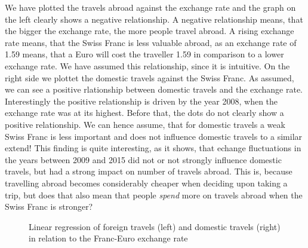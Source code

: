 \documentclass[12pt,a4paper,bibliography=totocnumbered,listof=totocnumbered]{scrartcl}
\begin{document}
We have plotted the travels abroad against the exchange rate and the graph on the left clearly shows a negative relationship. A negative relationship means, that the bigger the exchange rate, the more people travel abroad. A rising exchange rate means, that the Swiss Franc is less valuable abroad, as an exchange rate of 1.59 means, that a Euro will cost the traveller 1.59 in comparison to a lower exchange rate. We have assumed this relationship, since it is intuitive. On the right side we plottet the domestic travels against the Swiss Franc. As assumed, we can see a positive rlationship between domestic travels and the exchange rate. Interestingly the positive relationship is driven by the year 2008, when the exchange rate was at its highest. Before that, the dots do not clearly show a positive relationship. We can hence assume, that for domestic travels a weak Swiss Franc is less important and does not influence domestic travels to a similar extend! This finding is quite interesting, as it shows, that echange fluctuations in the years between 2009 and 2015 did not or not strongly influence domestic travels, but had a strong impact on number of travels abroad. This is, because travelling abroad becomes considerably cheaper when deciding upon taking a trip, but does that also mean that people \textit{spend} more on travels abroad when the Swiss Franc is stronger? 

\begin{figure}
\centering
     \qquad
\caption{Linear regression of foreign travels (left) and domestic travels (right) in relation to the Franc-Euro exchange rate}
\end{figure}
\end{document}
